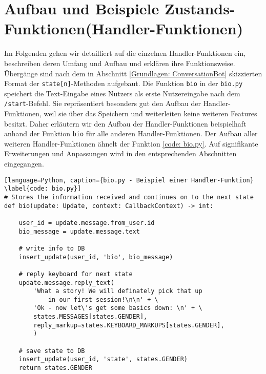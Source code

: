     \section{Aufbau und Beispiele Zustands-Funktionen(Handler-Funktionen)} \label{Implementierung: Handler Functions}
        Im Folgenden gehen wir detailliert auf die einzelnen Handler-Funktionen ein, beschreiben deren Umfang und Aufbau und erklären ihre Funktionsweise. Übergänge sind nach dem in Abschnitt \ref{Grundlagen: ConversationBot} skizzierten Format der \verb|state[n]|-Methoden aufgebaut. Die Funktion \verb|bio| in der \verb|bio.py| speichert die Text-Eingabe eines Nutzers als erste Nutzereingabe nach dem \verb|/start|-Befehl. Sie repräsentiert besonders gut den Aufbau der Handler-Funktionen, weil sie über das Speichern und weiterleiten keine weiteren Features besitzt. Daher erläutern wir den Aufbau der Handler-Funktionen beispielhaft anhand der Funktion \verb|bio| für alle anderen Handler-Funktionen. Der Aufbau aller weiteren Handler-Funktionen ähnelt der Funktion \ref*{code: bio.py}. Auf signifikante Erweiterungen und Anpassungen wird in den entsprechenden Abschnitten eingegangen.

            \begin{lstlisting}[language=Python, caption={bio.py - Beispiel einer Handler-Funktion} \label{code: bio.py}]
# Stores the information received and continues on to the next state
def bio(update: Update, context: CallbackContext) -> int:
    
    user_id = update.message.from_user.id
    bio_message = update.message.text
    
    # write info to DB
    insert_update(user_id, 'bio', bio_message)

    # reply keyboard for next state
    update.message.reply_text(
        'What a story! We will definately pick that up 
            in our first session!\n\n' + \
        'Ok - now let\'s get some basics down: \n' + \
        states.MESSAGES[states.GENDER],
        reply_markup=states.KEYBOARD_MARKUPS[states.GENDER],
        )

    # save state to DB
    insert_update(user_id, 'state', states.GENDER)
    return states.GENDER
            \end{lstlisting}

